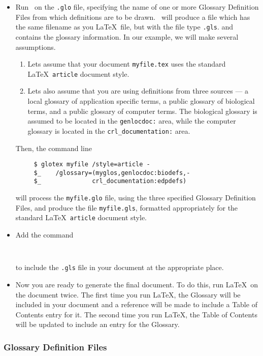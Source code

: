 \begin{itemize}
\item Run \GloTeX\ on the {\tt .glo} file, specifying the name of one or more
Glossary Definition Files from which definitions are to be drawn.  \GloTeX\ will
produce a file which has the same filename as you \LaTeX\ file, but with the
file type {\tt .gls}. and contains the glossary information. 
In our example, we will make several assumptions.  
\begin{enumerate}
\item Lets assume that your document {\tt myfile.tex} uses the standard \LaTeX\
{\tt article} document style. 
\item Lets also assume that you are using definitions from three sources ---
a local glossary of application specific terms, a public glossary of 
biological terms, and a public glossary of computer terms.  The biological
glossary is assumed to be located in the {\tt genlocdoc:} area, while the
computer glossary is located in the {\tt crl\_documentation:} area.
\end{enumerate}

Then, the command line
\begin{verbatim}
     $ glotex myfile /style=article -
     $_    /glossary=(myglos,genlocdoc:biodefs,-
     $_              crl_documentation:edpdefs)
\end{verbatim}
will process the {\tt myfile.glo} file, using the three specified Glossary
Definition Files, and produce the file {\tt myfile.gls}, formatted appropriately
for the standard \LaTeX\ {\tt article} document style.

\item Add the command
\begin{verbatim}
     
\end{verbatim}
to include the {\tt .gls} file in your document at the appropriate place.  

\item Now you are ready to generate the final document.  To do this, run
\LaTeX\ on the document twice.  The first time you run \LaTeX, the Glossary
will be included in your document and a reference will be made to include a
Table of Contents entry for it.  The second time you run \LaTeX, the Table of
Contents will be updated to include an entry for the Glossary. 
\end{itemize}



\subsubsection{Glossary Definition Files}
\label{glodeffile}

